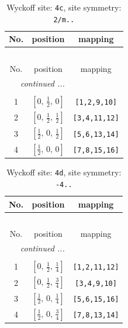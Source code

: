 \documentclass[fleqn,8pt]{jsarticle}
\begin{document}
\renewcommand{\arraystretch}{1.2}
\begin{longtable}{ccc}
\caption{Wyckoff site: {\tt 4c}, site symmetry: {\tt 2/m..}}
 \\
 \hline \hline
No. & position & mapping \\ \hline \endfirsthead

\multicolumn{2}{l}{\tablename\ \thetable{}} \\
 \hline \hline
No. & position & mapping \\ \hline \endhead

 \hline \hline
\multicolumn{2}{r}{\footnotesize\it continued ...} \\ \endfoot

 \hline \hline
\multicolumn{2}{r}{} \\ \endlastfoot

1 & $\left[ 0,\, \frac{1}{2},\, 0 \right]$ & {\tt [1,2,9,10]} \\ \hline
2 & $\left[ 0,\, \frac{1}{2},\, \frac{1}{2} \right]$ & {\tt [3,4,11,12]} \\ \hline
3 & $\left[ \frac{1}{2},\, 0,\, \frac{1}{2} \right]$ & {\tt [5,6,13,14]} \\ \hline
4 & $\left[ \frac{1}{2},\, 0,\, 0 \right]$ & {\tt [7,8,15,16]} \\
\end{longtable}
\renewcommand{\arraystretch}{1.2}
\begin{longtable}{ccc}
\caption{Wyckoff site: {\tt 4d}, site symmetry: {\tt -4..}}
 \\
 \hline \hline
No. & position & mapping \\ \hline \endfirsthead

\multicolumn{2}{l}{\tablename\ \thetable{}} \\
 \hline \hline
No. & position & mapping \\ \hline \endhead

 \hline \hline
\multicolumn{2}{r}{\footnotesize\it continued ...} \\ \endfoot

 \hline \hline
\multicolumn{2}{r}{} \\ \endlastfoot

1 & $\left[ 0,\, \frac{1}{2},\, \frac{1}{4} \right]$ & {\tt [1,2,11,12]} \\ \hline
2 & $\left[ 0,\, \frac{1}{2},\, \frac{3}{4} \right]$ & {\tt [3,4,9,10]} \\ \hline
3 & $\left[ \frac{1}{2},\, 0,\, \frac{1}{4} \right]$ & {\tt [5,6,15,16]} \\ \hline
4 & $\left[ \frac{1}{2},\, 0,\, \frac{3}{4} \right]$ & {\tt [7,8,13,14]} \\
\end{longtable}
\end{document}
